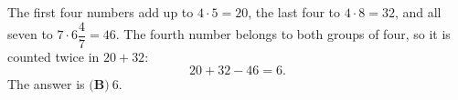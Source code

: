 The first four numbers add up to $4\cdot5=20$, the last four to $4\cdot8=32$, and all seven to $7\cdot6\dfrac47=46$. The fourth number belongs to both groups of four, so it is counted twice in $20+32$:
\[20+32-46=6.\]
The answer is $\boxed{\textbf{(B)}\ 6}$.
